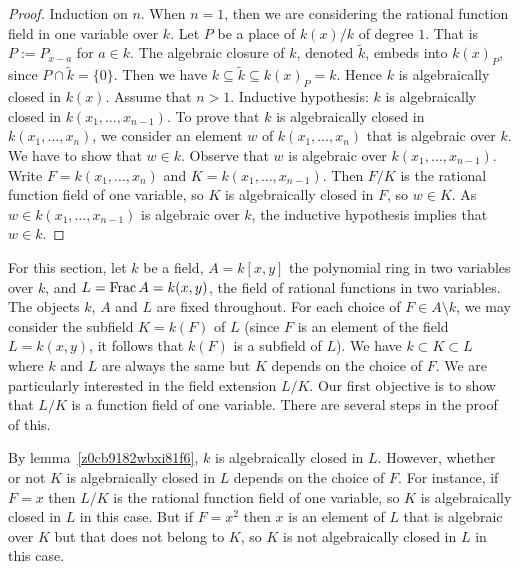\begin{proof}
	Induction on $n$. When $n= 1$, then we are considering 
	the rational function field in one variable over $k $.
	Let $P$ be a place of $k(x)/k$ of degree $1$. That is
	$P:=P_{x-a}$ for $a \in k$. The algebraic closure of 
	$k$, denoted $\tilde{k}$, embeds into $k(x)_P$, since 
	$P \cap \tilde{k} = \lbrace 0 \rbrace$. Then we have 
	$k \subseteq \tilde{k} \subseteq k(x)_P = k$. 
	Hence $k$ is algebraically closed in $k(x)$. 
	Assume that $n>1$.
	Inductive hypothesis: $k$ is algebraically closed 
	in $k(x_1, \dots, x_{n-1})$.
	To prove that $k$ is algebraically closed in $k(x_1, \dots, x_n)$, we consider
	an element $w$ of $k(x_1, \dots, x_n)$ that is algebraic 
	over $k$. We have to show that $w \in k$.
	Observe that $w$ is algebraic over $k(x_1, \dots, x_{n-1})$.
	Write $F = k(x_1, \dots, x_{n})$ and $K = k(x_1, \dots, x_{n-1})$.
	Then $F/K$ is the rational function field of one variable, 
	so $K$ is algebraically closed in $F$, so $w \in K$.
	As $w \in k(x_1, \dots, x_{n-1})$ is algebraic over $k$, 
	the inductive hypothesis implies that $w \in k$.
\end{proof}



For this section, let $ k$ be a field, $A =  k[x,y]$ 
the polynomial ring in two variables over $ k$,
and $L= \operatorname{{\rm Frac}} A =  k(x,y)$, the field of rational functions in two variables.
The objects $ k$, $A$ and $L$ are fixed throughout.
For each choice of $F \in A \setminus  k$, 
we may consider the subfield $K= k(F)$ of $L$
(since $F$ is an element of the field $L =  k(x,y)$, 
it follows that $ k(F)$ is a subfield of $L$).
We have $ k \subset K \subset L$ where $ k$ 
and $L$ are always the same but $K$ depends on the choice of $F$.
We are particularly interested in the field extension $L/K$.
Our first objective is to show that $L/K$ is a function field 
of one variable.
There are several steps in the proof of this.

\begin{remark}
	By lemma~\ref{z0cb9182wbxi81f6}, $ k$ is algebraically closed in $L$.
	However, whether or not $K$ is algebraically closed in $L$ depends on the choice of $F$.
	For instance, if $F=x$ then $L/K$ is the rational function field of one variable, so $K$ is algebraically closed 
	in $L$ in this case.  But if $F = x^2$ then $x$ is an element of $L$ that is algebraic over $K$ but that does not 
	belong to $K$, so $K$ is not algebraically closed in $L$ in this case.
\end{remark}

